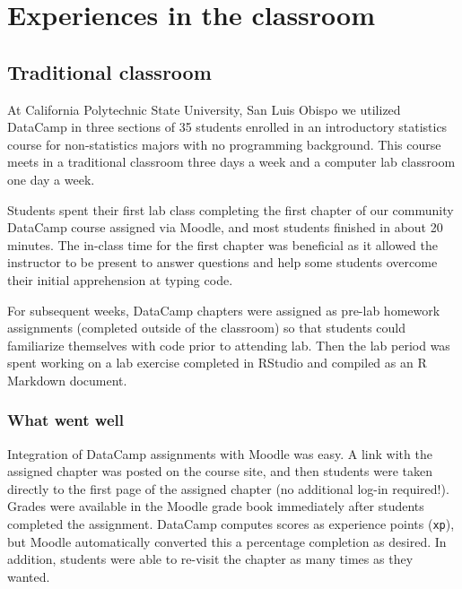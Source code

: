 \documentclass{tise_style_doi}
\begin{document}
\section{Experiences in the classroom}

\subsection{Traditional classroom}

At California Polytechnic State University, San Luis Obispo we utilized DataCamp
in three sections of 35 students enrolled in an introductory statistics course
for non-statistics majors with no programming background. This course meets in a
traditional classroom three days a week and a computer lab classroom one day a week.

Students spent their first lab class completing the first chapter of our community
DataCamp course assigned via Moodle, and most students finished in about 20 minutes.
The in-class time for the first chapter was beneficial as it allowed the instructor
to be present to answer questions and help some students overcome their initial
apprehension at typing code.

For subsequent weeks, DataCamp chapters were assigned as pre-lab homework assignments
(completed outside of the classroom) so that students could familiarize themselves with
code prior to attending lab.  Then the lab period was spent working on a lab exercise
completed in RStudio and compiled as an R Markdown document.

\subsubsection{What went well}

Integration of DataCamp assignments with Moodle was easy.  A link with the assigned
chapter was posted on the course site, and then students were taken directly to the
first page of the assigned chapter (no additional log-in required!). Grades were
available in the Moodle grade book immediately after students completed the assignment.
DataCamp computes scores as experience points (\texttt{xp}), but Moodle automatically
converted this a percentage completion as desired.  In addition, students were
able to re-visit the chapter as many times as they wanted.
\end{document}
